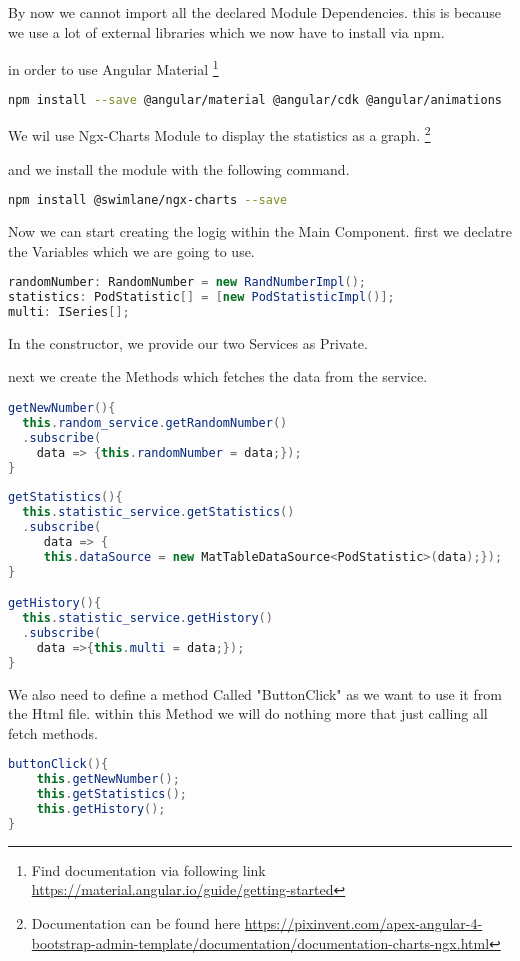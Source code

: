 By now we cannot import all the declared Module Dependencies. this is because we use a lot of external libraries which we now have to install via npm.

in order to use Angular Material \footnote{Find documentation via following link \url{https://material.angular.io/guide/getting-started}}
\begin{lstlisting}[language=Bash]
npm install --save @angular/material @angular/cdk @angular/animations 
\end{lstlisting}

We wil use Ngx-Charts Module to display the statistics as a graph.
\footnote{Documentation can be found here \url{https://pixinvent.com/apex-angular-4-bootstrap-admin-template/documentation/documentation-charts-ngx.html}}

and we install the module with the following command.
\begin{lstlisting}[language=Bash]
npm install @swimlane/ngx-charts --save
\end{lstlisting}

Now we can start creating the logig within the Main Component.
first we declatre the Variables which we are going to use.
\begin{lstlisting}[language=Java]
randomNumber: RandomNumber = new RandNumberImpl();
statistics: PodStatistic[] = [new PodStatisticImpl()];
multi: ISeries[];
\end{lstlisting}

In the constructor, we provide our two Services as Private.

next we create the Methods which fetches the data from the service.
\begin{lstlisting}[language=Java]
getNewNumber(){
  this.random_service.getRandomNumber()
  .subscribe(
    data => {this.randomNumber = data;});
}
  
getStatistics(){
  this.statistic_service.getStatistics()
  .subscribe(
     data => {
     this.dataSource = new MatTableDataSource<PodStatistic>(data);});
}

getHistory(){
  this.statistic_service.getHistory()
  .subscribe(
    data =>{this.multi = data;});
}
\end{lstlisting}

We also need to define a method Called "ButtonClick" as we want to use it from the Html file. within this Method we will do nothing more that just calling all fetch methods.
\begin{lstlisting}[language=Java]
buttonClick(){
    this.getNewNumber();
    this.getStatistics();
    this.getHistory();
}
\end{lstlisting}

